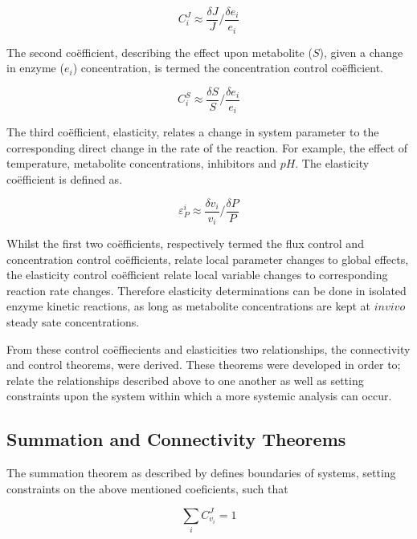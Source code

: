 \begin{equation}
C^{J}_{i}\approx\dfrac {\delta J}{J}/\dfrac {\delta e_{i}}{e_{i}}
\end{equation}

The second co\"efficient, describing the effect upon metabolite ($S$), given a change in enzyme ($e_{i}$) concentration, is termed the concentration control co\"efficient.

\begin{equation}
C^{S}_{i}\approx\dfrac{\delta S}{S}/\dfrac{\delta e_{i}}{e_{i}}
\end{equation}

The third co\"efficient, elasticity, relates a change in system parameter to the corresponding direct change in the rate of the reaction. For example, the effect of temperature, metabolite concentrations, inhibitors and $pH$. The elasticity co\"efficient is defined as.

\begin{equation}
\varepsilon^{i}_{P}\approx\dfrac{\delta v_{i}}{v_{i}}/\dfrac{\delta P}{P}
\end{equation}

Whilst the first two co\"efficients, respectively termed the flux control and concentration control co\"efficients, relate local parameter changes to global effects, the elasticity control co\"efficient relate local variable changes to corresponding reaction rate changes. Therefore elasticity determinations can be done in isolated enzyme kinetic reactions, as long as metabolite concentrations are kept at $in vivo$ steady sate concentrations. 

From these control co\"effiecients and elasticities two relationships, the connectivity and control theorems, were derived. These theorems were developed in order to; relate the relationships described above to one another as well as setting constraints upon the system within which a more systemic analysis can occur.

\subsection{Summation and Connectivity Theorems}

The summation theorem as described by \citeauthor{Kacser1979,Rapoport1974} defines boundaries of systems, setting constraints on the above mentioned coeficients, such that 

\begin{equation}\label{fluxSummation}
\sum_{i}C_{v_i}^J=1
\end{equation}

